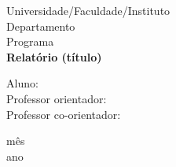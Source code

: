 \documentclass[a4paper, 12pt]{article}
\begin{document}

\begin{titlepage}
	\begin{center}
	

		\Huge{Universidade/Faculdade/Instituto}\\
		\large{Departamento}\\ 
		\large{Programa}\\ 
		\vspace{15pt}
        \vspace{95pt}
        \textbf{\LARGE{Relatório (título) }}\\
		\vspace{3,5cm}
	\end{center}
	
	\begin{flushleft}
		\begin{tabbing}
			Aluno: \\
			Professor orientador: \\
			Professor co-orientador: \\
	\end{tabbing}
 \end{flushleft}
	\vspace{1cm}
	
	\begin{center}
		\vspace{\fill}
			 mês\\
		 ano
			\end{center}
\end{titlepage}

\end{document}
